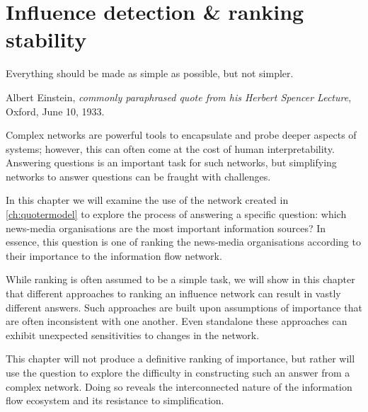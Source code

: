 \chapter{Influence detection \& ranking stability }\label{ch:ranking}


\epigraph{Everything should be made as simple as possible, but not simpler.}{Albert Einstein, {\em commonly paraphrased quote from his Herbert Spencer Lecture}, Oxford, June 10, 1933.}

Complex networks are powerful tools to encapsulate and probe deeper aspects of systems; however, this can often come at the cost of human interpretability. Answering questions is an important task for such networks, but simplifying networks to answer questions can be fraught with challenges.

In this chapter we will examine the use of the network created in \autoref{ch:quotermodel} to explore the process of answering a specific question: which news-media organisations are the most important information sources? In essence, this question is one of ranking the news-media organisations according to their importance to the information flow network. 

While ranking is often assumed to be a simple task, we will show in this chapter that different approaches to ranking an influence network can result in vastly different answers. Such approaches are built upon assumptions of importance that are often inconsistent with one another. Even standalone these approaches can exhibit unexpected sensitivities to changes in the network.

This chapter will not produce a definitive ranking of importance, but rather will use the question to explore the difficulty in constructing such an answer from a complex network. Doing so reveals the interconnected nature of the information flow ecosystem and its resistance to simplification.



